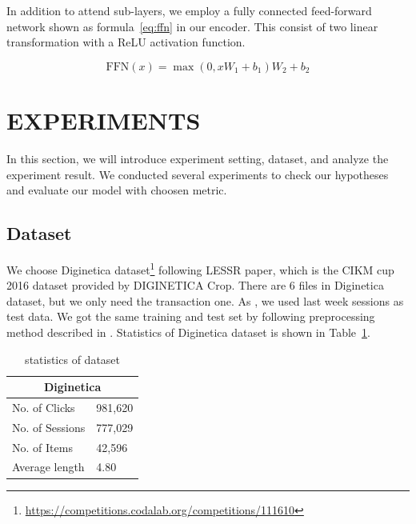 \documentclass{article}
\begin{document}
In addition to attend sub-layers,
we employ a fully connected feed-forward network
shown as formula~\ref{eq:ffn} in our encoder.
This consist of two linear transformation with a ReLU activation function.

\begin{equation}
    \label{eq:ffn}
    \textrm{FFN}\left(x\right)=\max{\left(0,xW_1+b_1\right)}W_2+b_2
\end{equation}




\section{EXPERIMENTS}

In this section, we will introduce experiment setting,
dataset, and analyze the experiment result.
We conducted several experiments to check our hypotheses and evaluate our
model with choosen metric.

\subsection{Dataset}

We choose Diginetica dataset\footnote{\url{https://competitions.codalab.org/competitions/111610}}
following LESSR \cite{chen2020lessr} paper,
which is the CIKM cup 2016 dataset provided by DIGINETICA Crop.
There are 6 files in Diginetica dataset, but we only need the transaction one.
As \cite{chen2020lessr}, we used last week sessions as test data.
We got the same training and test set by following preprocessing method
described in \cite{chen2020lessr}.
Statistics of Diginetica dataset is shown in Table~\ref{data-stats}.

\begin{table}
    \caption{statistics of dataset}
    \label{data-stats}
    \centering
    \begin{tabular}{ll}
        \toprule
        \multicolumn{2}{c}{Diginetica} \\
        \midrule
        No. of Clicks   & 981,620      \\
        No. of Sessions & 777,029      \\
        No. of Items    & 42,596       \\
        Average length  & 4.80         \\
        \bottomrule
    \end{tabular}
\end{table}
\end{document}
